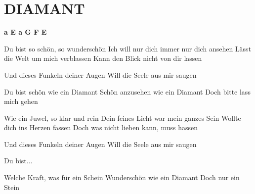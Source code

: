 \documentclass[../../../songbook.tex]{subfiles}
\begin{document}
\TabPositions{8cm} %
\section*{DIAMANT}
{}
\vspace{0.5cm}
{\color{red}\textbf{a E a G F E} } \newline
       
Du bist so schön, so wunderschön  			 \newline
Ich will nur dich immer nur dich ansehen     \newline
Lässt die Welt um mich verblassen   		 \newline
Kann den Blick nicht von dir lassen 		 \newline

Und dieses Funkeln deiner Augen	 \newline
Will die Seele aus mir saugen	 \newline
     
\-\hspace{1cm} Du bist schön wie ein Diamant 	 \newline
\-\hspace{1cm} Schön anzusehen wie ein Diamant	 \newline
\-\hspace{1cm} Doch bitte lass mich gehen		 \newline	

Wie ein Juwel, so klar und rein  \newline
Dein feines Licht war mein ganzes Sein \newline
Wollte dich ins Herzen fassen  \newline
Doch was nicht lieben kann, muss hassen \newline
 
Und dieses Funkeln deiner Augen \newline
Will die Seele aus mir saugen \newline
 
\-\hspace{1cm} Du bist... \newline
          
\-\hspace{1cm} Welche Kraft, was für ein Schein 	 \newline
\-\hspace{1cm} Wunderschön  wie ein Diamant		 \newline
\-\hspace{1cm} Doch nur ein Stein   				 \newline
\end{document}
